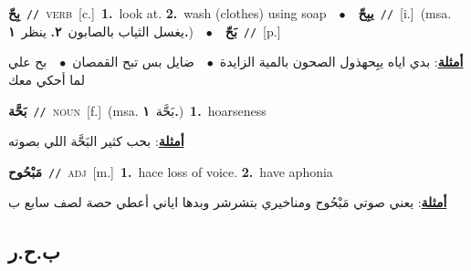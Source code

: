 \documentclass[10pt,a4paper,twoside]{article} %
\begin{document}
\begin{multicols}{2}
{{{{{{\setlength\topsep{0pt}\textbf{\foreignlanguage{arabic}{بِحّ}}\ {\color{gray}\texttt{//}\color{black}}\ \textsc{verb}\ [c.]\ \textbf{1.}~look at.  \textbf{2.}~wash (clothes) using soap\ \ $\bullet$\ \ \setlength\topsep{0pt}\textbf{\foreignlanguage{arabic}{يبِحّ}}\ {\color{gray}\texttt{//}\color{black}}\ [i.]\ \color{gray}(msa. \foreignlanguage{arabic}{يغسل الثياب بالصابون}~\foreignlanguage{arabic}{\textbf{٢.}}  \foreignlanguage{arabic}{ينظر}~\foreignlanguage{arabic}{\textbf{١.}})\color{black}\ \ $\bullet$\ \ \setlength\topsep{0pt}\textbf{\foreignlanguage{arabic}{بَحّ}}\ {\color{gray}\texttt{//}\color{black}}\ [p.]\  \begin{flushright}\color{gray}\foreignlanguage{arabic}{\textbf{\underline{\foreignlanguage{arabic}{أمثلة}}}: بدي اياه يبِحهذول الصحون بالمية الزايدة\ $\bullet$\ \  ضايل بس تبح القمصان\ $\bullet$\ \  بح علي لما أحكي معك}\end{flushright}\color{black}} \vspace{2mm}

{\setlength\topsep{0pt}\textbf{\foreignlanguage{arabic}{بَحَّة}}\ {\color{gray}\texttt{//}\color{black}}\ \textsc{noun}\ [f.]\ \color{gray}(msa. \foreignlanguage{arabic}{بَحَّة}~\foreignlanguage{arabic}{\textbf{١.}})\color{black}\ \textbf{1.}~hoarseness\  \begin{flushright}\color{gray}\foreignlanguage{arabic}{\textbf{\underline{\foreignlanguage{arabic}{أمثلة}}}: بحب كثير البَحَّة اللي بصوته}\end{flushright}\color{black}} \vspace{2mm}

{\setlength\topsep{0pt}\textbf{\foreignlanguage{arabic}{مَبْحُوح}}\ {\color{gray}\texttt{//}\color{black}}\ \textsc{adj}\ [m.]\ \textbf{1.}~hace loss of voice.  \textbf{2.}~have aphonia\  \begin{flushright}\color{gray}\foreignlanguage{arabic}{\textbf{\underline{\foreignlanguage{arabic}{أمثلة}}}: يعني صوتي مَبْحُوح ومناخيري بتشرشر وبدها اياني أعطي حصة لصف سابع ب}\end{flushright}\color{black}} \vspace{2mm}

\vspace{-3mm}
\subsection*{\color{blue}\foreignlanguage{arabic}{ب.ح.ر}\color{blue}{}} 

}}}}}
\end{multicols}
\end{document}
